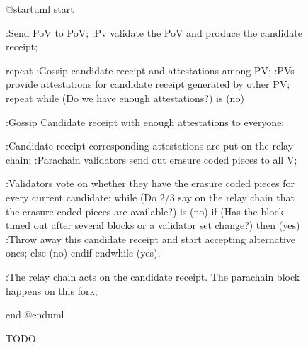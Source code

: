 \documentclass{book}
\begin{document}
\begin{figure}[h!]
\begin{plantuml}
@startuml
start

:Send PoV to PoV;
:Pv validate the PoV and
produce the candidate receipt;

repeat :Gossip candidate receipt and attestations among PV;
  :PVs provide attestations for candidate
  receipt generated by other PV;
repeat while (Do we have enough attestations?) is (no)

:Gossip Candidate receipt with enough attestations to everyone;

:Candidate receipt corresponding attestations are put on the relay chain;
:Parachain validators send out erasure coded pieces to all V;

:Validators vote on whether they have the erasure coded pieces for every current candidate;
while (Do 2/3 say on the relay chain that the erasure coded pieces are available?) is (no)
  if (Has the block timed out after several blocks or a validator set change?) then (yes)
    :Throw away this candidate receipt and start accepting alternative ones;
  else (no)
  endif
endwhile (yes);

:The relay chain acts on the candidate receipt. The parachain block happens on this fork;

end
@enduml
\end{plantuml}
\caption{TODO}
\end{figure}
\end{document}
